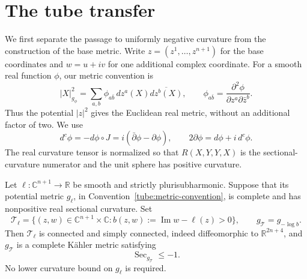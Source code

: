 \section{The tube transfer}\label{sec:tube}

We first separate the passage to uniformly negative curvature from the
construction of the base metric.  Write $z=(z^1,\ldots,z^{n+1})$ for the
base coordinates and $w=u+iv$ for one additional complex coordinate.
For a smooth real function $\phi$, our metric convention is
\begin{equation}\label{tube:metric-convention}
 |X|_{g_\phi}^{2}
 =\sum_{a,b}\phi_{a\bar b}\,dz^a(X)\overline{dz^b(X)},
 \qquad
 \phi_{a\bar b}=\frac{\partial^2\phi}{\partial z^a\partial\bar z^b}.
\end{equation}
Thus the potential $|z|^2$ gives the Euclidean real metric, without an
additional factor of two.  We use
\[
 d^c\phi=-d\phi\circ J=i(\bar\partial\phi-\partial\phi),
 \qquad 2\partial\phi=d\phi+i\,d^c\phi.
\]
The real curvature tensor is normalized so that
$R(X,Y,Y,X)$ is the sectional-curvature numerator and the unit sphere
has positive curvature.

\begin{lemma}\label{tube:transfer}
Let $\ell\colon\mathbb C^{n+1}\to\mathbb R$ be smooth and strictly
plurisubharmonic.  Suppose that its potential metric $g_\ell$, in
Convention~\eqref{tube:metric-convention}, is complete and has
nonpositive real sectional curvature.  Set
\begin{equation}\label{tube:domain}
 \mathcal T_\ell
 =\{(z,w)\in\mathbb C^{n+1}\times\mathbb C:
           b(z,w):=\operatorname{Im}w-\ell(z)>0\},
 \qquad g_{\mathcal T}=g_{-\log b}.
\end{equation}
Then $\mathcal T_\ell$ is connected and simply connected, indeed
diffeomorphic to $\mathbb R^{2n+4}$, and $g_{\mathcal T}$ is a complete
K\"ahler metric satisfying
\[
 \operatorname{Sec}_{g_{\mathcal T}}\le -1.
\]
No lower curvature bound on $g_\ell$ is required.
\end{lemma}

